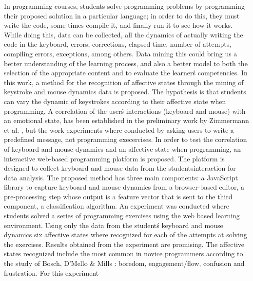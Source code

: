 \documentclass[a4paper,twoside]{article}
\begin{document}
In programming courses, students solve programming problems by programming their
proposed solution in a particular language; in order to do this, they must write the code,
some times compile it, and finally run it to see how it works. 
While doing this, data can be collected, all the dynamics of actually writing 
the code in the keyboard, errors, corrections, elapsed time, number of attempts,
compiling errors, exceptions, among others. Data mining this could
bring us a better understanding of the learning process, and also a better model to 
both the selection of the appropriate content and to evaluate the learner\'s competencies.
In this work, a method for the recognition of affective states through the
mining of keystroke and mouse dynamics data is proposed. 
The hypothesis is that students can vary the dynamic of keystrokes according 
to their affective state when programming. A correlation of the 
user\'s interactions (keyboard and mouse) with an emotional state, has been 
established in the preliminary work by Zimmermann
et al. \cite{zimmermann2003affective}, but the work experiments where
conducted by asking users to write a predefined message, not programming
execercises. 
In order to test the correlation of keyboard and mouse dynamics and an
affective state when programming, an interactive web-based 
programming platform is proposed. The platform is designed to collect
keyboard and mouse data from the students\' interaction for data analysis.
The proposed method has three main components: a JavaScript library to capture keyboard and mouse
dynamics from a browser-based editor, a pre-processing step whose output is a
feature vector that is sent to the third component, a classification algorithm.
An experiment was conducted where students solved a series of programming
exercises using the web based learning environment. Using only the data from the
student\'s keyboard and mouse dynamics six affective states where recognized for
each of the attempts at solving the exercises. Results obtained from the
experiment are promising. The affective states recognized include the most
common in novice programmers according to the study of Bosch, D'Mello \& Mills
\cite{bixler2013detecting}: boredom, engagement/flow, confusion and frustration. For this experiment
\end{document}

